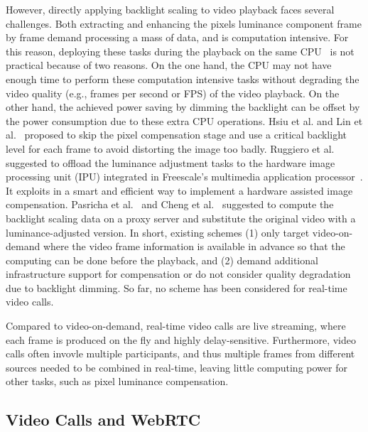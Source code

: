 However, directly applying backlight scaling to video playback faces
several challenges. Both extracting and enhancing the pixels luminance
component frame by frame demand processing a mass of data, and is
computation intensive.  For this reason, deploying these tasks during
the playback on the same CPU~\cite{CHP07, CSC02} is not practical
because of two reasons.  On the one hand, the CPU may not have enough
time to perform these computation intensive tasks without degrading
the video quality (e.g., frames per second or FPS) of the video playback. On
the other hand, the achieved power saving by dimming the backlight can be
offset by the power consumption due to these extra CPU operations. Hsiu et al. and Lin et
al.~\cite{LHH14, HLH11} proposed to skip the pixel compensation stage
and use a critical backlight level for each frame to avoid distorting
the image too badly. Ruggiero et al. suggested to offload the
luminance adjustment tasks to the hardware image processing unit (IPU)
integrated in Freescale’s multimedia application
processor~\cite{RBB08}. It exploits in a smart and efficient way to
implement a hardware assisted image compensation.
Pasricha et al.~\cite{PMLDV03} and Cheng et al.~\cite{CMEDV07}
suggested to compute the backlight scaling data on a proxy server and
substitute the original video with a luminance-adjusted version. In
short, existing schemes (1) only target video-on-demand where the
video frame information is available in advance so that the computing
can be done before the playback, and (2) demand additional
infrastructure support for compensation or do not consider quality
degradation due to backlight dimming. So far, no scheme has been
considered for real-time video calls.

Compared to video-on-demand, real-time video calls are live streaming,
where each frame is produced on the fly and highly
delay-sensitive. Furthermore, video calls often invovle
multiple participants, and thus multiple frames from different sources
needed to be combined in real-time, leaving little computing power for
other tasks, such as pixel luminance compensation.

\subsection{Video Calls and WebRTC}

